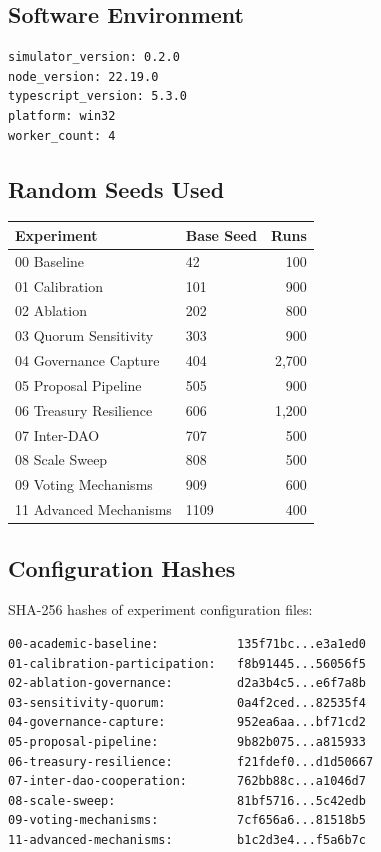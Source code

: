 
\subsection{Software Environment}

\begin{verbatim}
simulator_version: 0.2.0
node_version: 22.19.0
typescript_version: 5.3.0
platform: win32
worker_count: 4
\end{verbatim}

\subsection{Random Seeds Used}

\begin{tabular}{@{}llr@{}}
\toprule
Experiment & Base Seed & Runs \\
\midrule
00 Baseline & 42 & 100 \\
01 Calibration & 101 & 900 \\
02 Ablation & 202 & 800 \\
03 Quorum Sensitivity & 303 & 900 \\
04 Governance Capture & 404 & 2{,}700 \\
05 Proposal Pipeline & 505 & 900 \\
06 Treasury Resilience & 606 & 1{,}200 \\
07 Inter-DAO & 707 & 500 \\
08 Scale Sweep & 808 & 500 \\
09 Voting Mechanisms & 909 & 600 \\
11 Advanced Mechanisms & 1109 & 400 \\
\bottomrule
\end{tabular}

\subsection{Configuration Hashes}

SHA-256 hashes of experiment configuration files:
\begin{verbatim}
00-academic-baseline:           135f71bc...e3a1ed0
01-calibration-participation:   f8b91445...56056f5
02-ablation-governance:         d2a3b4c5...e6f7a8b
03-sensitivity-quorum:          0a4f2ced...82535f4
04-governance-capture:          952ea6aa...bf71cd2
05-proposal-pipeline:           9b82b075...a815933
06-treasury-resilience:         f21fdef0...d1d50667
07-inter-dao-cooperation:       762bb88c...a1046d7
08-scale-sweep:                 81bf5716...5c42edb
09-voting-mechanisms:           7cf656a6...81518b5
11-advanced-mechanisms:         b1c2d3e4...f5a6b7c
\end{verbatim}

